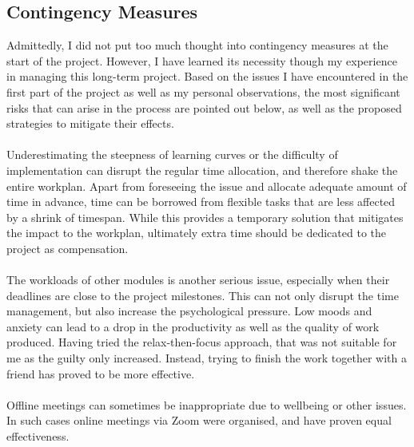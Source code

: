 \subsection{Contingency Measures}
Admittedly, I did not put too much thought into contingency measures at the start of the project. However, I have learned its necessity though my experience in managing this long-term project. Based on the issues I have encountered in the first part of the project as well as my personal observations, the most significant risks that can arise in the process are pointed out below, as well as the proposed strategies to mitigate their effects.
\\\\
Underestimating the steepness of learning curves or the difficulty of implementation can disrupt the regular time allocation, and therefore shake the entire workplan. Apart from foreseeing the issue and allocate adequate amount of time in advance, time can be borrowed from flexible tasks that are less affected by a shrink of timespan. While this provides a temporary solution that mitigates the impact to the workplan, ultimately extra time should be dedicated to the project as compensation.
\\\\
The workloads of other modules is another serious issue, especially when their deadlines are close to the project milestones. This can not only disrupt the time management, but also increase the psychological pressure. Low moods and anxiety can lead to a drop in the productivity as well as the quality of work produced. Having tried the relax-then-focus approach, that was not suitable for me as the guilty only increased. Instead, trying to finish the work together with a friend has proved to be more effective.
\\\\
Offline meetings can sometimes be inappropriate due to wellbeing or other issues. In such cases online meetings via Zoom were organised, and have proven equal effectiveness.


